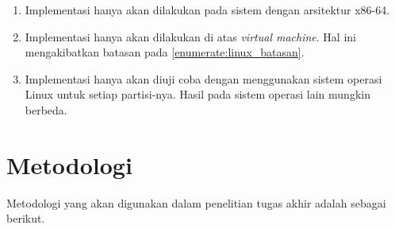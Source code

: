 \begin{enumerate}

    \item Implementasi hanya akan dilakukan pada sistem dengan arsitektur x86-64.

    \item Implementasi hanya akan dilakukan di atas \textit{virtual machine}. Hal ini
	    mengakibatkan batasan pada \autoref{enumerate:linux_batasan}.

    \item \label{enumerate:linux_batasan} Implementasi hanya akan diuji coba dengan menggunakan sistem operasi Linux untuk
	    setiap partisi-nya. Hasil pada sistem operasi lain mungkin berbeda.

\end{enumerate}

\section{Metodologi}

Metodologi yang akan digunakan dalam penelitian tugas akhir adalah sebagai berikut.


